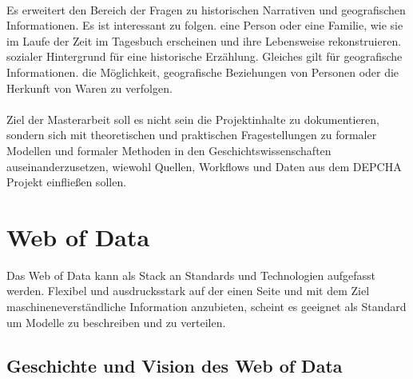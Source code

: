 \documentclass[12pt,a4paper]{article}
\begin{document}
\\
Es erweitert den Bereich der Fragen zu historischen Narrativen und geografischen Informationen. Es ist interessant zu folgen.
eine Person oder eine Familie, wie sie im Laufe der Zeit im Tagesbuch erscheinen und ihre Lebensweise rekonstruieren. 
sozialer Hintergrund für eine historische Erzählung. Gleiches gilt für geografische Informationen.
die Möglichkeit, geografische Beziehungen von Personen oder die Herkunft von Waren zu verfolgen.
\\
\\
Ziel der Masterarbeit soll es nicht sein die Projektinhalte zu dokumentieren, sondern sich mit theoretischen und praktischen Fragestellungen zu formaler Modellen und formaler Methoden in den Geschichtswissenschaften  auseinanderzusetzen, wiewohl Quellen, Workflows und Daten aus dem DEPCHA Projekt einfließen sollen.


\section{Web of Data}
\label{WebofData}
Das Web of Data kann als Stack an Standards und Technologien aufgefasst werden. Flexibel und ausdrucksstark auf der einen Seite und mit dem Ziel maschineneverständliche Information anzubieten, scheint es geeignet als Standard um Modelle zu beschreiben und zu verteilen.

\subsection{Geschichte und Vision des Web of Data}
\end{document}

